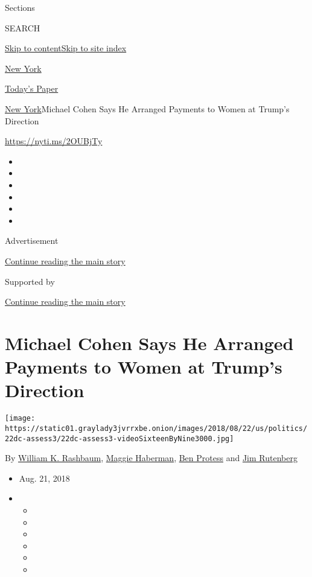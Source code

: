 Sections

SEARCH

\protect\hyperlink{site-content}{Skip to
content}\protect\hyperlink{site-index}{Skip to site index}

\href{https://www.nytimes3xbfgragh.onion/section/nyregion}{New York}

\href{https://myaccount.nytimes3xbfgragh.onion/auth/login?response_type=cookie\&client_id=vi}{}

\href{https://www.nytimes3xbfgragh.onion/section/todayspaper}{Today's
Paper}

\href{/section/nyregion}{New York}\textbar{}Michael Cohen Says He
Arranged Payments to Women at Trump's Direction

\url{https://nyti.ms/2OUBjTy}

\begin{itemize}
\item
\item
\item
\item
\item
\item
\end{itemize}

Advertisement

\protect\hyperlink{after-top}{Continue reading the main story}

Supported by

\protect\hyperlink{after-sponsor}{Continue reading the main story}

\hypertarget{michael-cohen-says-he-arranged-payments-to-women-at-trumps-direction}{%
\section{Michael Cohen Says He Arranged Payments to Women at Trump's
Direction}\label{michael-cohen-says-he-arranged-payments-to-women-at-trumps-direction}}

\texttt{[image: https://static01.graylady3jvrrxbe.onion/images/2018/08/22/us/politics/22dc-assess3/22dc-assess3-videoSixteenByNine3000.jpg]}

By
\href{http://www.nytimes3xbfgragh.onion/by/william-k-rashbaum}{William
K. Rashbaum},
\href{http://www.nytimes3xbfgragh.onion/by/maggie-haberman}{Maggie
Haberman}, \href{http://www.nytimes3xbfgragh.onion/by/ben-protess}{Ben
Protess} and
\href{http://www.nytimes3xbfgragh.onion/by/jim-rutenberg}{Jim Rutenberg}

\begin{itemize}
\item
  Aug. 21, 2018
\item
  \begin{itemize}
  \item
  \item
  \item
  \item
  \item
  \item
  \end{itemize}
\end{itemize}

